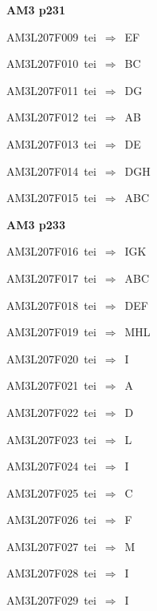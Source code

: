 \par\vfill\eject
{\bf\hfill AM3 p231\hfill\hbox{}}\par\bigskip
{\sixrm AM3L207F009\ {\sixit tei}\ }$\Rightarrow$\ EF\par\smallskip
{\sixrm AM3L207F010\ {\sixit tei}\ }$\Rightarrow$\ BC\par\smallskip
{\sixrm AM3L207F011\ {\sixit tei}\ }$\Rightarrow$\ DG\par\smallskip
{\sixrm AM3L207F012\ {\sixit tei}\ }$\Rightarrow$\ AB\par\smallskip
{\sixrm AM3L207F013\ {\sixit tei}\ }$\Rightarrow$\ DE\par\smallskip
{\sixrm AM3L207F014\ {\sixit tei}\ }$\Rightarrow$\ DGH\par\smallskip
{\sixrm AM3L207F015\ {\sixit tei}\ }$\Rightarrow$\ ABC\par\smallskip

\par\vfill\eject
{\bf\hfill AM3 p233\hfill\hbox{}}\par\bigskip
{\sixrm AM3L207F016\ {\sixit tei}\ }$\Rightarrow$\ IGK\par\smallskip
{\sixrm AM3L207F017\ {\sixit tei}\ }$\Rightarrow$\ ABC\par\smallskip
{\sixrm AM3L207F018\ {\sixit tei}\ }$\Rightarrow$\ DEF\par\smallskip
{\sixrm AM3L207F019\ {\sixit tei}\ }$\Rightarrow$\ MHL\par\smallskip
{\sixrm AM3L207F020\ {\sixit tei}\ }$\Rightarrow$\ I\par\smallskip
{\sixrm AM3L207F021\ {\sixit tei}\ }$\Rightarrow$\ A\par\smallskip
{\sixrm AM3L207F022\ {\sixit tei}\ }$\Rightarrow$\ D\par\smallskip
{\sixrm AM3L207F023\ {\sixit tei}\ }$\Rightarrow$\ L\par\smallskip
{\sixrm AM3L207F024\ {\sixit tei}\ }$\Rightarrow$\ I\par\smallskip
{\sixrm AM3L207F025\ {\sixit tei}\ }$\Rightarrow$\ C\par\smallskip
{\sixrm AM3L207F026\ {\sixit tei}\ }$\Rightarrow$\ F\par\smallskip
{\sixrm AM3L207F027\ {\sixit tei}\ }$\Rightarrow$\ M\par\smallskip
{\sixrm AM3L207F028\ {\sixit tei}\ }$\Rightarrow$\ I\par\smallskip
{\sixrm AM3L207F029\ {\sixit tei}\ }$\Rightarrow$\ I\par\smallskip

